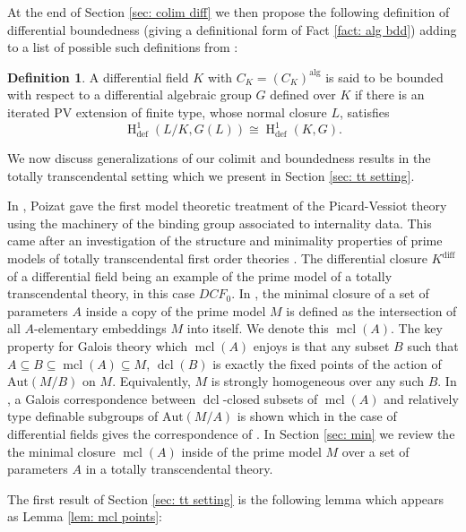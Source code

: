 \documentclass{amsart}
\theoremstyle{definition}
\newtheorem{definition}[theorem]{Definition}
\theoremstyle{remark}
\numberwithin{equation}{section}
\def \defin {\operatorname{def}}
\def \HH {\operatorname{H}}
\def \diff {\operatorname{diff}}
\def \alg {\operatorname{alg}}
\def \aut {\text{Aut}}
\def \mcl {\operatorname{mcl}}
\def \dcl {\operatorname{dcl}}
\begin{document}
At the end of Section \ref{sec: colim diff} we then propose the following definition of differential boundedness (giving a definitional form of Fact \ref{fact: alg bdd}) adding to a list of possible such definitions from \cite{AnandDavidComm}:

\begin{definition}\label{def: diff bdd}
    A differential field $K$ with $C_K = (C_K)^{\alg}$ is said to be bounded with respect to a differential algebraic group $G$ defined over $K$ if there is an iterated PV extension of finite type, whose normal closure $L$, satisfies $$\HH^1_{\defin}(L/K,G(L)) \cong \HH^1_{\defin}(K,G).$$
\end{definition}

We now discuss generalizations of our colimit and boundedness results in the totally transcendental setting which we present in Section \ref{sec: tt setting}.

In \cite{poizatimaginare}, Poizat gave the first model theoretic treatment of the Picard-Vessiot theory using the machinery of the binding group associated to internality data. This came after an investigation of the structure and minimality properties of prime models of totally transcendental first order theories \cite{PoizatPrime}.  The differential closure $K^{\diff}$ of a differential field being an example of the prime model of a totally transcendental theory, in this case $DCF_0$. In \cite{PoizatPrime}, the minimal closure of a set of parameters $A$ inside a copy of the prime model $M$ is defined as the intersection of all $A$-elementary embeddings $M$ into itself. We denote this $\mcl(A)$. The key property for Galois theory which $\mcl(A)$ enjoys is that any subset $B$ such that $A \subseteq B \subseteq \mcl(A) \subseteq M$, $\dcl(B)$ is exactly the fixed points of the action of $\aut(M/B)$ on $M$. Equivalently, $M$ is strongly homogeneous over any such $B$. In \cite{meretzky2026galoistheoryautomorphismgroups}, a Galois correspondence between $\dcl$-closed subsets of $\mcl(A)$ and relatively type definable subgroups of $\aut(M/A)$ is shown which in the case of differential fields gives the correspondence of \cite{magid2022completepicardvessiotclosure}.  In Section \ref{sec: min} we review the the minimal closure $\mcl(A)$ inside of  the prime model $M$ over a set of parameters $A$ in a totally transcendental theory. 

The first result of Section \ref{sec: tt setting} is the following lemma which appears as Lemma \ref{lem: mcl points}:
\end{document}
